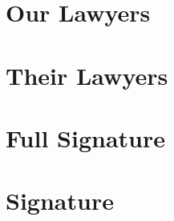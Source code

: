 \documentclass[sign]{lawdoc}
\begin{document}
  \maketitlepage

  \makefullcaption

  \makecaption

  \section{Our Lawyers}

  \makeourlawyersblock

  \section{Their Lawyers}

  \maketheirlawyersblock

  \section{Full Signature}

  \makefullsignature

  \section{Signature}

  \makesignature

  \makecertificateofservice
\end{document}
